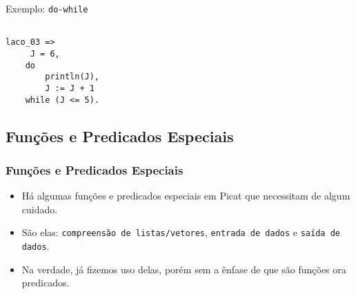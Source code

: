 \begin{frame}[fragile]

\begin{block}{Exemplo: \texttt{do-while} }

\begin{lstlisting}[frame=single]
     
laco_03 =>  
     J = 6,  
    do  
        println(J),  
        J := J + 1  
    while (J <= 5).  
\end{lstlisting}
        
\end{block}
\end{frame}    



\subsection{Funções e Predicados Especiais}


\begin{frame}[fragile]

\frametitle{Funções e Predicados Especiais}
\begin{itemize}
    
    \item Há algumas funções e predicados especiais em Picat 
    que necessitam de algum cuidado.
    
    \pause
    \item São elas: \texttt{compreensão de listas/vetores}, 
    \texttt{entrada de dados} e \texttt{saída de dados}.
    
    \item Na verdade, já fizemos uso delas, porém sem a ênfase de que
    são funções ora predicados.
    
\end{itemize}
\end{frame}      


